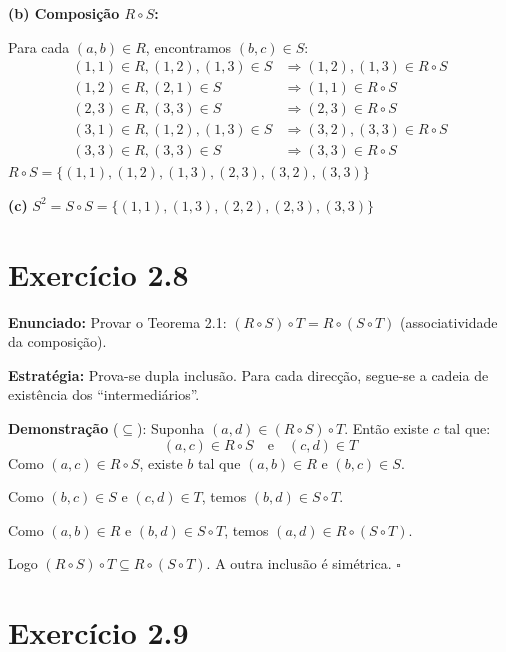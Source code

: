 \documentclass[12pt,a4paper]{article}
\begin{document}
\textbf{(b) Composição $R \circ S$:}

Para cada $(a,b) \in R$, encontramos $(b,c) \in S$:
\begin{align*}
(1,1) \in R, (1,2),(1,3) \in S &\Rightarrow (1,2),(1,3) \in R \circ S \\
(1,2) \in R, (2,1) \in S &\Rightarrow (1,1) \in R \circ S \\
(2,3) \in R, (3,3) \in S &\Rightarrow (2,3) \in R \circ S \\
(3,1) \in R, (1,2),(1,3) \in S &\Rightarrow (3,2),(3,3) \in R \circ S \\
(3,3) \in R, (3,3) \in S &\Rightarrow (3,3) \in R \circ S
\end{align*}
$R \circ S = \{(1,1),(1,2),(1,3),(2,3),(3,2),(3,3)\}$

\textbf{(c)} $S^2 = S \circ S = \{(1,1),(1,3),(2,2),(2,3),(3,3)\}$

\section*{Exercício 2.8}

\textbf{Enunciado:} Provar o Teorema 2.1: $(R \circ S) \circ T = R \circ (S \circ T)$ (associatividade da composição).

\begin{teoribox}
\textbf{Estratégia:} Prova-se dupla inclusão. Para cada direcção, segue-se a cadeia de existência dos ``intermediários''.
\end{teoribox}

\textbf{Demonstração} ($\subseteq$): Suponha $(a,d) \in (R \circ S) \circ T$. Então existe $c$ tal que:
\[
(a,c) \in R \circ S \quad \text{e} \quad (c,d) \in T
\]
Como $(a,c) \in R \circ S$, existe $b$ tal que $(a,b) \in R$ e $(b,c) \in S$.

Como $(b,c) \in S$ e $(c,d) \in T$, temos $(b,d) \in S \circ T$.

Como $(a,b) \in R$ e $(b,d) \in S \circ T$, temos $(a,d) \in R \circ (S \circ T)$.

Logo $(R \circ S) \circ T \subseteq R \circ (S \circ T)$. A outra inclusão é simétrica. \hfill$\square$

\section*{Exercício 2.9}
\end{document}
